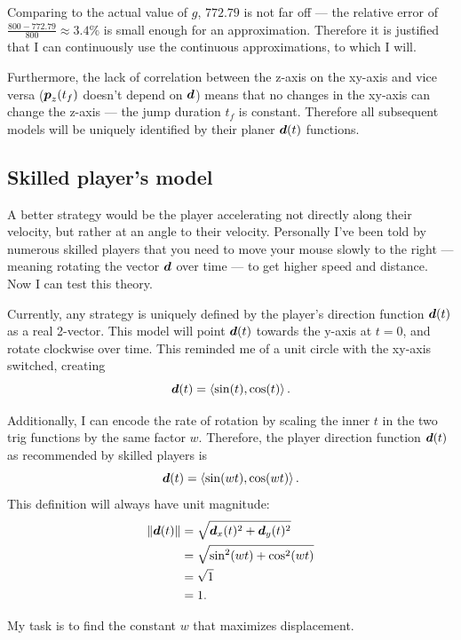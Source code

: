 Comparing to the actual value of $g$, $772.79$ is not far off --- the relative error of $\frac{800 - 772.79}{800} \approx 3.4\%$ is small enough for an approximation. Therefore it is justified that I can continuously use the continuous approximations, to which I will.

Furthermore, the lack of correlation between the z-axis on the xy-axis and vice versa ($\boldsymbol{p}_z(t_f)$ doesn't depend on $\boldsymbol{d}$) means that no changes in the xy-axis can change the z-axis --- the jump duration $t_f$ is constant. Therefore all subsequent models will be uniquely identified by their planer $\boldsymbol{d}(t)$ functions.

\subsection{Skilled player's model}
A better strategy would be the player accelerating not directly along their velocity, but rather at an angle to their velocity. Personally I've been told by numerous skilled players that you need to move your mouse slowly to the right --- meaning rotating the vector $\boldsymbol{d}$ over time --- to get higher speed and distance. Now I can test this theory.

Currently, any strategy is uniquely defined by the player's direction function $\boldsymbol{d}(t)$ as a real 2-vector. This model will point $\boldsymbol{d}(t)$ towards the y-axis at $t=0$, and rotate clockwise over time. This reminded me of a unit circle with the xy-axis switched, creating
\[
    \boldsymbol{d}(t) = \left\langle \sin(t), \cos(t) \right\rangle.
\]

Additionally, I can encode the rate of rotation by scaling the inner $t$ in the two trig functions by the same factor $w$. Therefore, the player direction function $\boldsymbol{d}(t)$ as recommended by skilled players is
\[
    \boldsymbol{d}(t) = \left\langle \sin(wt), \cos(wt) \right\rangle.
\]
This definition will always have unit magnitude:
\begin{align*}
    \|\boldsymbol{d}(t)\| &= \sqrt{\boldsymbol{d}_x(t)^2 + \boldsymbol{d}_y(t)^2}\\
    &= \sqrt{\sin^2(wt) + \cos^2(wt)}\\
    &= \sqrt{1}\\
    &= 1.
\end{align*}

My task is to find the constant $w$ that maximizes displacement.


